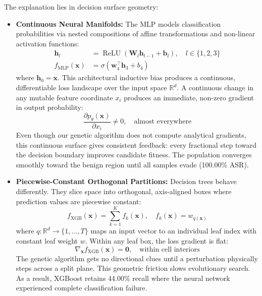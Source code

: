 \documentclass[final,5p,times,twocolumn]{elsarticle}
\begin{document}
The explanation lies in decision surface geometry:
\begin{itemize}
    \item \textbf{Continuous Neural Manifolds:} The MLP models classification probabilities via nested compositions of affine transformations and non-linear activation functions:
    \begin{align}
        \mathbf{h}_l &= \operatorname{ReLU}(\mathbf{W}_l \mathbf{h}_{l-1} + \mathbf{b}_l), \quad l \in \{1, 2, 3\} \\
        f_{\text{MLP}}(\mathbf{x}) &= \sigma\left(\mathbf{w}_4^\top \mathbf{h}_3 + b_4\right)
    \end{align}
    where $\mathbf{h}_0 = \mathbf{x}$.
    This architectural inductive bias produces a continuous, differentiable loss landscape over the input space $\mathbb{R}^d$. A continuous change in any mutable feature coordinate $x_i$ produces an immediate, non-zero gradient in output probability:
    \begin{equation}
        \frac{\partial p_\theta(\mathbf{x})}{\partial x_i} \neq 0, \quad \text{almost everywhere}
    \end{equation}
    Even though our genetic algorithm does not compute analytical gradients, this continuous surface gives consistent feedback: every fractional step toward the decision boundary improves candidate fitness. The population converges smoothly toward the benign region until all samples evade (100.00\% ASR).
    \item \textbf{Piecewise-Constant Orthogonal Partitions:} Decision trees behave differently. They slice space into orthogonal, axis-aligned boxes where prediction values are piecewise constant:
    \begin{equation}
        f_{\text{XGB}}(\mathbf{x}) = \sum_{k=1}^K f_k(\mathbf{x}), \quad f_k(\mathbf{x}) = w_{q(\mathbf{x})}
    \end{equation}
    where $q: \mathbb{R}^d \rightarrow \{1, \dots, T\}$ maps an input vector to an individual leaf index with constant leaf weight $w$. Within any leaf box, the loss gradient is flat:
    \begin{equation}
        \nabla_{\mathbf{x}} f_{\text{XGB}}(\mathbf{x}) = \mathbf{0}, \quad \text{within cell interiors}
    \end{equation}
    The genetic algorithm gets no directional clues until a perturbation physically steps across a split plane. This geometric friction slows evolutionary search. As a result, XGBoost retains 44.00\% recall where the neural network experienced complete classification failure.
\end{itemize}
\end{document}
